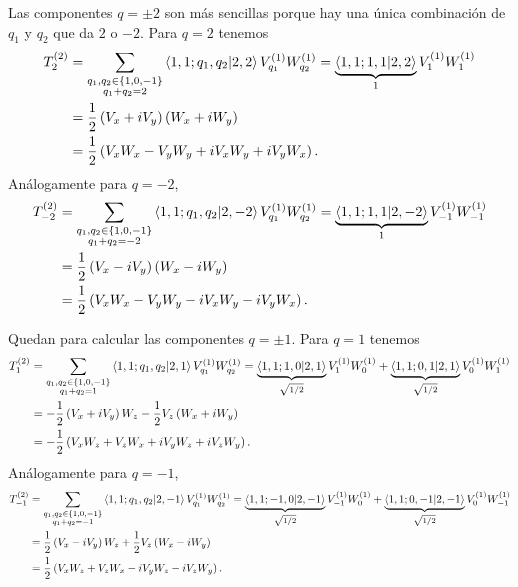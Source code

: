 \documentclass[10pt, a4paper]{article}
\numberwithin{equation}{subsection}
\begin{document}
Las componentes $q = \pm2$ son más sencillas porque hay una única combinación
de $q_1$ y $q_2$ que da $2$ o $-2$. Para $q = 2$ tenemos
\begin{align}
  T^{(2)}_2 &= \sum_{\substack{q_1,q_2\in\set{1,0,-1} \\ q_1 + q_2 = 2}}
    \ClebschGordan{1}{1}{q_1}{q_2}{2}{2} V^{(1)}_{q_1} W^{(1)}_{q_2}
    = \underbrace{\ClebschGordan{1}{1}{1}{1}{2}{2}}_{1} V^{(1)}_{1} W^{(1)}_{1} \nonumber
    \\
  &= \frac{1}{2}\left(V_x +iV_y\right)\left(W_x +iW_y\right) \\
  &= \frac{1}{2}\left(V_xW_x - V_yW_y + iV_xW_y + iV_yW_x\right).
\end{align}
Análogamente para $q = -2$,
\begin{align}
  T^{(2)}_{-2} &= \sum_{\substack{q_1,q_2\in\set{1,0,-1} \\ q_1 + q_2 = -2}}
    \ClebschGordan{1}{1}{q_1}{q_2}{2}{-2} V^{(1)}_{q_1} W^{(1)}_{q_2}
    = \underbrace{\ClebschGordan{1}{1}{1}{1}{2}{-2}}_{1} V^{(1)}_{-1} W^{(1)}_{-1}
    \nonumber \\
  &= \frac{1}{2}\left(V_x -iV_y\right)\left(W_x -iW_y\right) \\
  &= \frac{1}{2}\left(V_xW_x - V_yW_y - iV_xW_y - iV_yW_x\right).
\end{align}

Quedan para calcular las componentes $q = \pm1$. Para $q = 1$ tenemos
\begin{align}
  T^{(2)}_{1} &= \sum_{\substack{q_1,q_2\in\set{1,0,-1} \\ q_1 + q_2 = 1}}
    \ClebschGordan{1}{1}{q_1}{q_2}{2}{1} V^{(1)}_{q_1} W^{(1)}_{q_2}
    = \underbrace{\ClebschGordan{1}{1}{1}{0}{2}{1}}_{\sqrt{1/2}} V^{(1)}_{1} W^{(1)}_{0} +
    \underbrace{\ClebschGordan{1}{1}{0}{1}{2}{1}}_{\sqrt{1/2}} V^{(1)}_{0} W^{(1)}_{1}
    \nonumber \\
  &= -\frac{1}{2}\left(V_x+iV_y\right)W_z -\frac{1}{2}V_z\left(W_x+iW_y\right)
    \nonumber \\
  &= -\frac{1}{2}\left(V_xW_z + V_zW_x + iV_yW_z + iV_zW_y\right).
\end{align}
Análogamente para $q = -1$,
\begin{align}
  T^{(2)}_{-1} &= \sum_{\substack{q_1,q_2\in\set{1,0,-1} \\ q_1 + q_2 = -1}}
    \ClebschGordan{1}{1}{q_1}{q_2}{2}{-1} V^{(1)}_{q_1} W^{(1)}_{q_2}
    = \underbrace{\ClebschGordan{1}{1}{-1}{0}{2}{-1}}_{\sqrt{1/2}}V^{(1)}_{-1}W^{(1)}_{0}
    + \underbrace{\ClebschGordan{1}{1}{0}{-1}{2}{-1}}_{\sqrt{1/2}}V^{(1)}_{0}W^{(1)}_{-1}
    \nonumber \\
  &= \frac{1}{2}\left(V_x-iV_y\right)W_z + \frac{1}{2}V_z\left(W_x-iW_y\right)
    \nonumber \\
  &= \frac{1}{2}\left(V_xW_z + V_zW_x - iV_yW_z - iV_zW_y\right).
\end{align}
\end{document}
